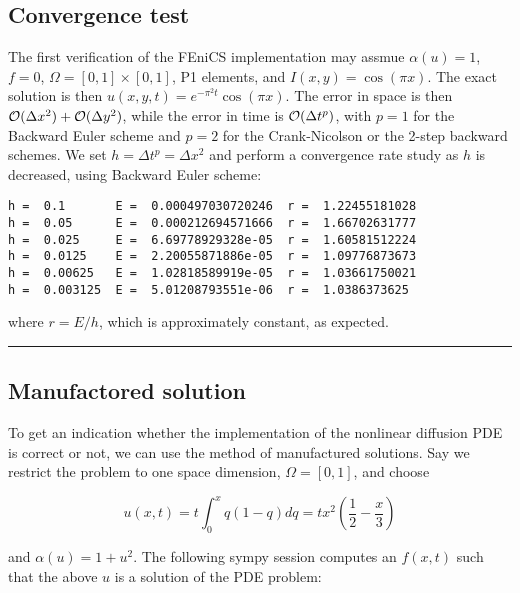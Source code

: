 \documentclass[letterpaper,10pt,english]{/usr/share/sphinx/texinputs/sphinxhowto}
\begin{document}
\subsection{Convergence test}

The first verification of the FEniCS implementation may assmue
$\alpha (u)=1$, $f=0$, $\Omega = [0,1]\times [0,1]$, P1 elements, and
$I(x,y)=\cos(\pi x)$. The exact solution is then
$u(x,y,t)=e^{-\pi^2 t}\cos (\pi x)$. The error in space is then
${\cal O}(\Delta x^2) + {\cal O}(\Delta y^2)$, while the error in time
is ${\cal O}(\Delta t^p)$, with $p=1$ for the Backward Euler scheme and
$p=2$ for the Crank-Nicolson or the 2-step backward schemes. We set
$h=\Delta t^p = \Delta x^2$ and perform a convergence rate study as $h$
is decreased, using Backward Euler scheme:

\begin{verbatim}
h =  0.1       E =  0.000497030720246  r =  1.22455181028
h =  0.05      E =  0.000212694571666  r =  1.66702631777
h =  0.025     E =  6.69778929328e-05  r =  1.60581512224
h =  0.0125    E =  2.20055871886e-05  r =  1.09776873673
h =  0.00625   E =  1.02818589919e-05  r =  1.03661750021
h =  0.003125  E =  5.01208793551e-06  r =  1.0386373625
\end{verbatim}

where $r = E/h$, which is approximately constant, as expected.\begin{center}\rule{3in}{0.4pt}\end{center}

\subsection{Manufactored solution}

To get an indication whether the implementation of the nonlinear
diffusion PDE is correct or not, we can use the method of manufactured
solutions. Say we restrict the problem to one space dimension,
$\Omega=[0,1]$, and choose

\[
u(x,t) = t\int_0^x q(1-q)dq = tx^2\left(\frac{1}{2} - \frac{x}{3}\right)
\]

and $\alpha(u) = 1+u^2$. The following sympy session computes an
$f(x,t)$ such that the above $u$ is a solution of the PDE problem:

\end{document}
